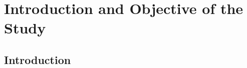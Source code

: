 \chapter{Introduction and Objective of the Study}

\section{Introduction}\label{sec:Introduction}


